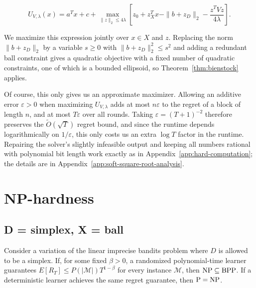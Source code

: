{{\begin{equation*}
U_{V,\lambda}(x)=a^{T}x+c+\max_{\|z\|_2\le4\lambda}
\left[z_0+z_X^{T}x-\|b+z_D\|_2-\frac{z^{T}Vz}{4\lambda}\right].
\end{equation*}

We maximize this expression jointly over $x\in X$ and $z$. Replacing the
norm $\|b+z_D\|_2$ by a variable $s\ge0$ with $\|b+z_D\|_2^2\le s^2$ and
adding a redundant ball constraint gives a quadratic objective with a fixed
number of quadratic constraints, one of which is a bounded ellipsoid, so
Theorem~\ref{thm:bienstock} applies.

Of course, this only gives us an approximate maximizer. Allowing an additive
error $\varepsilon>0$ when maximizing $U_{V,\lambda}$ adds at most
$n\varepsilon$ to the regret of a block of length $n$, and at most
$T\varepsilon$ over all rounds. Taking $\varepsilon=(T+1)^{-2}$ therefore
preserves the $\tilde{O}(\sqrt{T})$ regret bound, and since the runtime
depends logarithmically on $1/\varepsilon$, this only costs us an extra
$\log T$ factor in the runtime. Repairing the solver's slightly infeasible
output and keeping all numbers rational with polynomial bit length work
exactly as in Appendix~\ref{app:hard-computation}; the details are in
Appendix~\ref{app:soft-square-root-analysis}.

}


\section{NP-hardness}


\subsection{D = simplex, X = ball}

\begin{theorem}

  Consider a variation of the linear imprecise bandits problem where $D$ is allowed to be a simplex. If, for
  some fixed $\beta > 0$, a randomized polynomial-time learner guarantees $E \left[ R_{T} \right] \le P \left( | \mathcal{M} | \right) T^{1 - \beta}$ for every instance $\mathcal{M}$, then $\text{\normalfont NP} \subseteq \text{\normalfont BPP}$. If a deterministic learner achieves the same regret guarantee, then $\text{\normalfont P} = \text{\normalfont NP}$.

 \label{thm:additive-simplex-np-hardness}


\end{theorem}}
